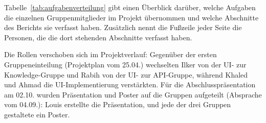 Tabelle~\ref{tab:aufgabenverteilung} gibt einen Überblick darüber, welche Aufgaben die einzelnen Gruppenmitglieder im Projekt übernommen und welche Abschnitte des Berichts sie verfasst haben. Zusätzlich nennt die Fußzeile jeder Seite die Personen, die die dort stehenden Abschnitte verfasst haben.

Die Rollen verschoben sich im Projektverlauf: Gegenüber der ersten Gruppeneinteilung (Projektplan vom 25.04.) wechselten Ilker von der UI- zur Knowledge-Gruppe und Rabih von der UI- zur API-Gruppe, während Khaled und Ahmad die UI-Implementierung verstärkten. Für die Abschlusspräsentation am 02.10. wurden Präsentation und Poster auf die Gruppen aufgeteilt (Absprache vom 04.09.): Louis erstellte die Präsentation, und jede der drei Gruppen gestaltete ein Poster.

\renewcommand{\arraystretch}{1.3}
